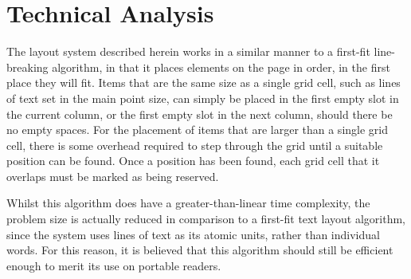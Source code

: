 \chapter{Technical Analysis}\label{ch:techanalysis}


The layout system described herein works in a similar manner to a first-fit line-breaking algorithm, in that it places elements on the page in order, in the first place they will fit. Items that are the same size as a single grid cell, such as lines of text set in the main point size, can simply be placed in the first empty slot in the current column, or the first empty slot in the next column, should there be no empty spaces.  For the placement of items that are larger than a single grid cell, there is some overhead required to step through the grid until a suitable position can be found. Once a position has been found, each grid cell that it overlaps must be marked as being reserved.

Whilst this algorithm does have a greater-than-linear time complexity, the problem size is actually reduced in comparison to a first-fit text layout algorithm, since the system uses lines of text as its atomic units, rather than individual words. For this reason, it is believed that this algorithm should still be efficient enough to merit its use on portable \ebook{} readers.